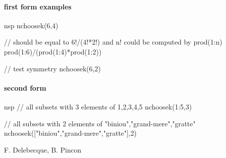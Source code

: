 \begin{examples}
\paragraph{first form examples}
\begin{mintednsp}{nsp}
nchoosek(6,4)

// should be equal to 6!/(4!*2!) and n! could be computed by prod(1:n)
prod(1:6)/(prod(1:4)*prod(1:2))

// test symmetry
nchoosek(6,2)
\end{mintednsp}
\end{examples}

\begin{examples}
\paragraph{second form}
\begin{mintednsp}{nsp}
// all subsets with 3 elements of {1,2,3,4,5}
nchoosek(1:5,3)

// all subsets with 2 elements of {"biniou","grand-mere","gratte"}
nchoosek(["biniou","grand-mere","gratte"],2)
\end{mintednsp}
\end{examples}


\begin{manseealso}
\end{manseealso}

\begin{authors}
F. Delebecque, B. Pincon
\end{authors}

